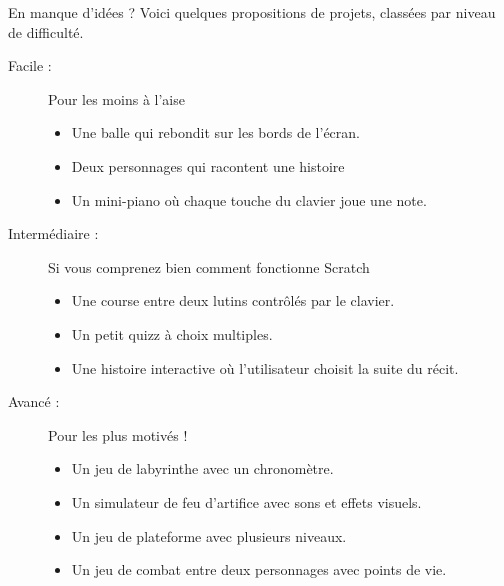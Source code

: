 \begin{UPSTIinfor}{En manque d'idées ?}
    Voici quelques propositions de projets, classées par niveau de difficulté. 
    
    \begin{description}
        \item[Facile :]  Pour les moins à l'aise 
        \begin{itemize}
            \item Une balle qui rebondit sur les bords de l’écran.  
            \item Deux personnages qui racontent une histoire
            \item Un mini-piano où chaque touche du clavier joue une note.  
        \end{itemize}

        \item[Intermédiaire :] Si vous comprenez bien comment fonctionne Scratch
        \begin{itemize}
            \item Une course entre deux lutins contrôlés par le clavier.  
            \item Un petit quizz à choix multiples.  
            \item Une histoire interactive où l’utilisateur choisit la suite du récit.  
        \end{itemize}

        \item[Avancé :]  Pour les plus motivés !
        \begin{itemize}
            \item Un jeu de labyrinthe avec un chronomètre.  
            \item Un simulateur de feu d’artifice avec sons et effets visuels.  
            \item Un jeu de plateforme avec plusieurs niveaux.  
            \item Un jeu de combat entre deux personnages avec points de vie.  
        \end{itemize}
    \end{description}
\end{UPSTIinfor}